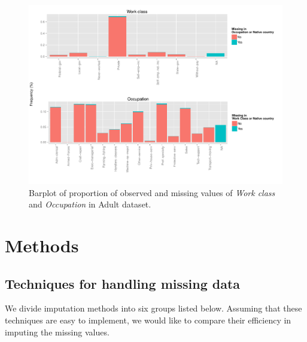 \documentclass[12pt]{article}
\begin{document}
\begin{figure}[htbp] 
   \centering
   \includegraphics[scale=.6]{barplot-missing.pdf} 
   \caption{Barplot of proportion of observed and missing values of \textit{Work class} and \textit{Occupation} in Adult dataset.}
   \label{barplot-missing}
\end{figure}

\section{Methods}


\subsection{Techniques for handling missing data}
We divide imputation methods into six groups listed
below\citep{batista2003analysis}. Assuming that these techniques are easy to
implement, we would like to compare their efficiency in imputing the missing
values.
\end{document}
